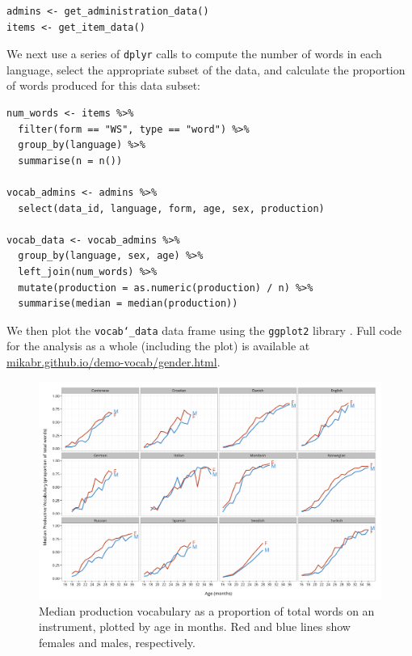 \documentclass[man,noapacite]{apa}
\begin{document}
\begin{lstlisting}
admins <- get_administration_data()
items <- get_item_data()
\end{lstlisting}

\noindent We next use a series of \texttt{dplyr} calls to compute the number of words in each language,  select the appropriate subset of the data, and calculate the proportion of words produced for this data subset:

\begin{lstlisting}
num_words <- items %>%
  filter(form == "WS", type == "word") %>%
  group_by(language) %>%
  summarise(n = n())

vocab_admins <- admins %>%
  select(data_id, language, form, age, sex, production)

vocab_data <- vocab_admins %>%
  group_by(language, sex, age) %>%
  left_join(num_words) %>%
  mutate(production = as.numeric(production) / n) %>%
  summarise(median = median(production))
\end{lstlisting}

\noindent We then plot the \texttt{vocab\char`_data} data frame using the \texttt{ggplot2} library \cite{wickham2009}. Full code for the analysis as a whole (including the plot) is available at \url{mikabr.github.io/demo-vocab/gender.html}.

\begin{figure}[ht!]
\includegraphics[width=6in]{figures/gender.png}
\caption{\label{fig:gender} Median production vocabulary as a proportion of total words on an instrument, plotted by age in months. Red and blue lines show females and males, respectively.}
\end{figure}
\end{document}
